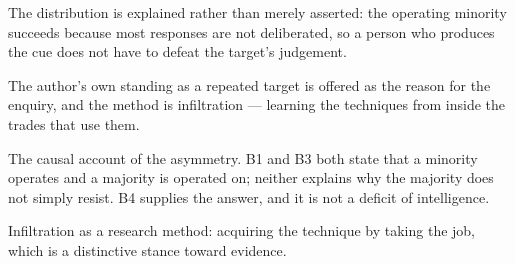

\begin{distilled}
  \item The distribution is explained rather than merely asserted: the operating minority succeeds because most responses are not deliberated, so a person who produces the cue does not have to defeat the target's judgement.
  \item The author's own standing as a repeated target is offered as the reason for the enquiry, and the method is infiltration --- learning the techniques from inside the trades that use them.
\end{distilled}

\begin{unique}
  \item The causal account of the asymmetry. B1 and B3 both state that a minority operates and a majority is operated on; neither explains why the majority does not simply resist. B4 supplies the answer, and it is not a deficit of intelligence.
  \item Infiltration as a research method: acquiring the technique by taking the job, which is a distinctive stance toward evidence.
\end{unique}

